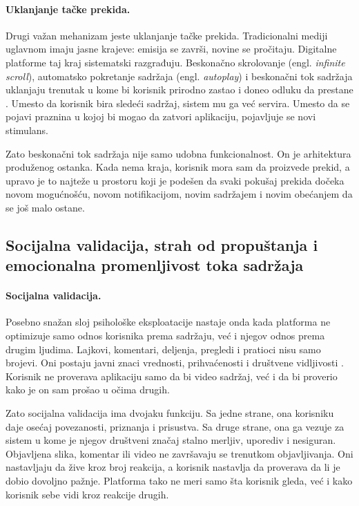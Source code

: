 \paragraph{Uklanjanje tačke prekida.}
Drugi važan mehanizam jeste uklanjanje tačke prekida. Tradicionalni mediji uglavnom imaju jasne krajeve: emisija se završi, novine se pročitaju. Digitalne platforme taj kraj sistematski razgrađuju. Beskonačno skrolovanje (engl. \textit{infinite scroll}), automatsko pokretanje sadržaja (engl. \textit{autoplay}) i beskonačni tok sadržaja uklanjaju trenutak u kome bi korisnik prirodno zastao i doneo odluku da prestane \cite{montag2019addictive}. Umesto da korisnik bira sledeći sadržaj, sistem mu ga već servira. Umesto da se pojavi praznina u kojoj bi mogao da zatvori aplikaciju, pojavljuje se novi stimulans.

Zato beskonačni tok sadržaja nije samo udobna funkcionalnost. On je arhitektura produženog ostanka. Kada nema kraja, korisnik mora sam da proizvede prekid, a upravo je to najteže u prostoru koji je podešen da svaki pokušaj prekida dočeka novom mogućnošću, novom notifikacijom, novim sadržajem i novim obećanjem da se još malo ostane.

\subsection{Socijalna validacija, strah od propuštanja i emocionalna promenljivost toka sadržaja}

\paragraph{Socijalna validacija.}
Posebno snažan sloj psihološke eksploatacije nastaje onda kada platforma ne optimizuje samo odnos korisnika prema sadržaju, već i njegov odnos prema drugim ljudima. Lajkovi, komentari, deljenja, pregledi i pratioci nisu samo brojevi. Oni postaju javni znaci vrednosti, prihvaćenosti i društvene vidljivosti \cite{wadsley2022reward}. Korisnik ne proverava aplikaciju samo da bi video sadržaj, već i da bi proverio kako je on sam prošao u očima drugih.

Zato socijalna validacija ima dvojaku funkciju. Sa jedne strane, ona korisniku daje osećaj povezanosti, priznanja i prisustva. Sa druge strane, ona ga vezuje za sistem u kome je njegov društveni značaj stalno merljiv, uporediv i nesiguran. Objavljena slika, komentar ili video ne završavaju se trenutkom objavljivanja. Oni nastavljaju da žive kroz broj reakcija, a korisnik nastavlja da proverava da li je dobio dovoljno pažnje. Platforma tako ne meri samo šta korisnik gleda, već i kako korisnik sebe vidi kroz reakcije drugih.

